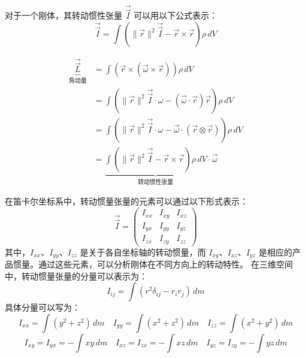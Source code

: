 \documentclass[12pt, a4paper, oneside, UTF8]{ctexbook}  %
\begin{document}
\begin{defn}
    对于一个刚体，其转动惯性张量 \(\vec{\vec{I}}\) 可以用以下公式表示：
\[
\vec{\vec{I}} = \int \left( \|\vec{r}\|^2 \vec{\vec{I}} - \vec{r} \times \vec{r} \right) \rho \, dV
\]
\begin{tui}
    \begin{align*}
        \underbrace{\vec{\vec{L}}}_{\text{角动量}} &= \int \left( \vec{r} \times \left(\vec{\omega}\times\vec{r}\right) \right) \rho \, dV\\
        &=\int \left( \|\vec{r}\|^2 \vec{\vec{I}}\cdot\omega-\left(\vec{\omega}\cdot\vec{r}\right)\vec{r}\right) \rho \, dV\\
        &=\int \left( \|\vec{r}\|^2 \vec{\vec{I}}\cdot\omega-\vec{\omega}\cdot\left(\vec{r}\otimes\vec{r}\right)\right) \rho \, dV\\
        &=\underbrace{\int \left( \|\vec{r}\|^2 \vec{\vec{I}} - \vec{r} \times \vec{r} \right) \rho \, dV}_{\text{转动惯性张量}}\cdot\vec{\omega}
    \end{align*}
\end{tui}
\end{defn}
\begin{example}
    在笛卡尔坐标系中，转动惯量张量的元素可以通过以下形式表示：
\[
\vec{\vec{I}} = \begin{pmatrix}
I_{xx} & I_{xy} & I_{xz} \\
I_{yx} & I_{yy} & I_{yz} \\
I_{zx} & I_{zy} & I_{zz}
\end{pmatrix}
\]
其中，\(I_{xx}\)、\(I_{yy}\)、\(I_{zz}\) 是关于各自坐标轴的转动惯量，而 \(I_{xy}\)、\(I_{xz}\)、\(I_{yz}\) 是相应的产品惯量。通过这些元素，可以分析刚体在不同方向上的转动特性。
在三维空间中，转动惯量张量的分量可以表示为：
\[
I_{ij} = \int (r^2 \delta_{ij} - r_i r_j) \, dm
\]
具体分量可以写为：
\[
I_{xx} = \int (y^2 + z^2) \, dm\quad
I_{yy} = \int (x^2 + z^2) \, dm\quad
I_{zz} = \int (x^2 + y^2) \, dm
\]
\[
I_{xy} = I_{yx} = -\int xy \, dm\quad
I_{xz} = I_{zx} = -\int xz \, dm\quad
I_{yz} = I_{zy} = -\int yz \, dm
\]
\end{example}
\end{document}
